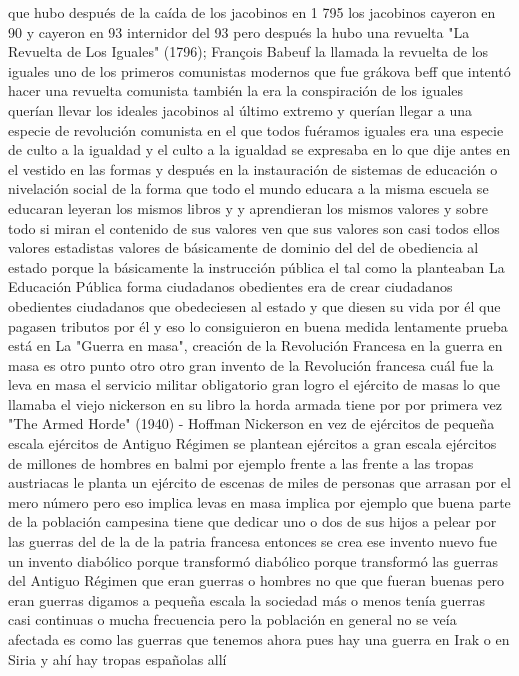 que hubo después de la caída de los jacobinos en 1 795 los jacobinos cayeron en 90 y
cayeron en 93 internidor del 93 pero después la hubo una revuelta
"La Revuelta de Los Iguales" (1796); François Babeuf
la llamada la revuelta de los iguales uno de los primeros comunistas modernos que fue grákova beff
que intentó hacer una revuelta comunista también la era la conspiración de los iguales querían llevar los ideales jacobinos al último extremo
y querían llegar a una especie de revolución comunista en el que todos fuéramos iguales era una especie de culto a la igualdad y el culto a la igualdad
se expresaba en lo que dije antes en el vestido en las formas y después en la instauración de sistemas de educación
o nivelación social de la forma que todo el mundo educara a la misma escuela se educaran leyeran los mismos libros
y y aprendieran los mismos valores y sobre todo si miran el contenido de sus valores ven que sus valores son casi todos ellos
valores estadistas valores de básicamente de dominio del
del de obediencia al estado porque la básicamente la instrucción pública el tal como la planteaban
La Educación Pública forma ciudadanos obedientes
era de crear ciudadanos obedientes ciudadanos que obedeciesen al estado y que diesen su vida por él
que pagasen tributos por él y eso lo consiguieron en buena medida lentamente prueba está en
La "Guerra en masa", creación de la Revolución Francesa
en la guerra en masa es otro punto otro otro gran invento de la Revolución francesa cuál fue la leva en masa
el servicio militar obligatorio gran logro el ejército de masas
lo que llamaba el viejo nickerson en su libro la horda armada tiene por por primera vez
"The Armed Horde" (1940) - Hoffman Nickerson
en vez de ejércitos de pequeña escala ejércitos de Antiguo Régimen se plantean ejércitos a gran escala
ejércitos de millones de hombres en balmi por ejemplo frente a las frente a las tropas austriacas
le planta un ejército de escenas de miles de personas que arrasan por el mero número pero eso implica levas en masa
implica por ejemplo que buena parte de la población campesina tiene que dedicar uno o dos de sus hijos a pelear por las guerras del
de la de la patria francesa entonces se crea ese invento nuevo fue un invento diabólico porque transformó diabólico
porque transformó las guerras del Antiguo Régimen que eran guerras o hombres no que que fueran buenas pero eran guerras digamos a pequeña escala
la sociedad más o menos tenía guerras casi continuas o mucha frecuencia pero la población en general no se veía afectada
es como las guerras que tenemos ahora pues hay una guerra en Irak o en Siria y ahí hay tropas españolas allí
